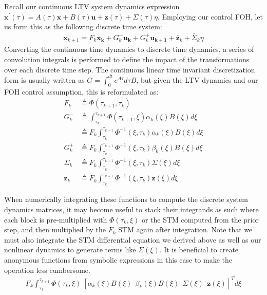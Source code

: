 \documentclass[conf]{new-aiaa}
\begin{document}
Recall our continuous LTV system dynamics expression $\mathbf{x}^\prime(\tau) =  A(\tau)\mathbf{x} + B(\tau)\mathbf{u} + \mathbf{z}(\tau) + \Sigma(\tau)\eta$. Employing our control FOH, let us form this as the following discrete time system:
\begin{align}
	\mathbf{x}_{k+1} = F_k\mathbf{x_k} + G^-_k\mathbf{u_k} + G^+_k\mathbf{u_{k+1}} + \bar{\mathbf{z}}_k + \bar{\Sigma}_k\eta
\end{align}
Converting the continuous time dynamics to discrete time dynamics, a series of convolution integrals is performed to define the impact of the transformations over each discrete time step. The continuous linear time invariant discretization form is usually written as $G=\int_{0}^{dt} e^{A \tau} d \tau B$, but given the LTV dynamics and our FOH control assumption, this is reformulated as:
%
\begin{subequations}
\label{disc}
 \begin{align}
 F_k &\triangleq  \Phi(\tau_{k+1},\tau_k)\\
 G^-_k &\triangleq \int_{\tau_k}^{\tau_{k+1}}  \Phi(\tau_{k+1},\xi) \alpha_k(\xi)B(\xi) d\xi\\
 &\triangleq F_k \int_{\tau_k}^{\tau_{k+1}}  \Phi^{-1}(\xi,\tau_{k}) \alpha_k(\xi)B(\xi) d\xi\\
 G^+_k &\triangleq F_k \int_{\tau_k}^{\tau_{k+1}}  \Phi^{-1}(\xi,\tau_{k}) \beta_k(\xi)B(\xi) d\xi\\
 \bar{\Sigma}_k &\triangleq  F_k \int_{\tau_k}^{\tau_{k+1}} \Phi^{-1}(\xi,\tau_{k}) \Sigma(\xi) d\xi\\
 \bar{\mathbf{z}}_k &\triangleq F_k \int_{\tau_k}^{\tau_{k+1}} \Phi^{-1}(\xi,\tau_{k}) \mathbf{z}(\xi) d\xi
\end{align}
\end{subequations}

When numerically integrating these functions to compute the discrete system dynamics matrices, it may become useful to stack their integrands as such where each block is pre-multiplied with $\Phi(\tau_{k}, \xi)$ or the STM computed from the prior step, and then multiplied by the $F_k$ STM again after integration. Note that we must also integrate the STM differential equation we derived above as well as our nonlinear dynamics to generate terms like $\Sigma(\xi)$. It is beneficial to create anonymous functions from symbolic expressions in this case to make the operation less cumbersome.
\begin{align}
	F_k \int_{\tau_k}^{\tau_{k+1}} \Phi(\tau_{k}, \xi) \  [ \alpha_k(\xi)B(\xi) \ \ \beta_k(\xi)B(\xi) \ \ \Sigma(\xi) \ \ \mathbf{z}(\xi)   ]^T d\xi
\end{align}
\end{document}
